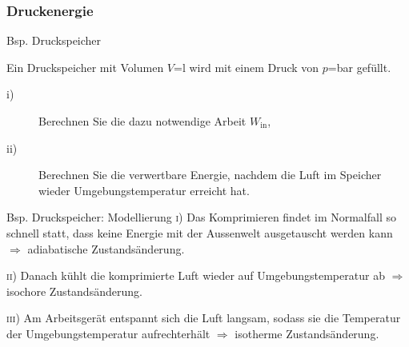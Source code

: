 
\begin{frame}
  \frametitle{Druckenergie}
  \begin{block}{Bsp. Druckspeicher}

    Ein Druckspeicher mit Volumen $V$=\unit[10]{l}
    wird mit einem Druck von $p$=\unit[4]{bar} gef\"ullt.

    \begin{description}
      \item[i)] Berechnen Sie die dazu notwendige Arbeit $W_\mathrm{in}$,
      \item[ii)] Berechnen Sie die verwertbare Energie, nachdem die Luft 
        im Speicher wieder Umgebungstemperatur erreicht hat.
    \end{description}
  \end{block}
  \begin{block}{Bsp. Druckspeicher: Modellierung}
    \textsc{i}) Das Komprimieren findet im Normalfall so schnell statt, dass keine 
    Energie mit der Aussenwelt ausgetauscht werden kann $\Longrightarrow$ 
    adiabatische Zustands\"anderung.

    \textsc{ii}) Danach k\"uhlt die komprimierte Luft wieder auf Umgebungstemperatur 
    ab $\Longrightarrow$ isochore Zustands\"anderung.

    \textsc{iii}) Am Arbeitsger\"at entspannt sich die Luft langsam, sodass sie 
    die Temperatur der Umgebungstemperatur aufrechterh\"alt 
    $\Longrightarrow$ isotherme Zustands\"anderung.


\end{block}
\end{frame}
